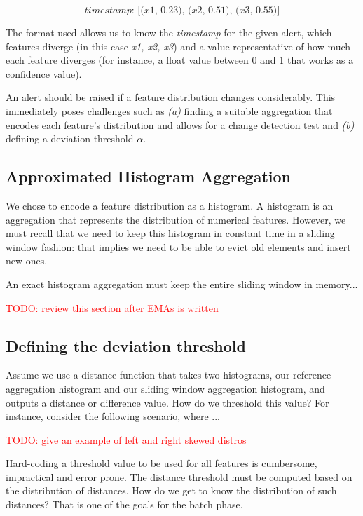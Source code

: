\[\textit{timestamp: [(x1, 0.23), (x2, 0.51), (x3, 0.55)}]\]

The format used allows us to know the \textit{timestamp} for the given alert, which features diverge (in this case \textit{x1, x2, x3}) and a value representative of how much each feature diverges (for instance, a float value between 0 and 1 that works as a confidence value). 

An alert should be raised if a feature distribution changes considerably. This immediately poses challenges such as \textit{(a)} finding a suitable aggregation that encodes each feature's distribution and allows for a change detection test and \textit{(b)} defining a deviation threshold $\alpha$.

\subsection*{Approximated Histogram Aggregation}

We chose to encode a feature distribution as a histogram. A histogram is an aggregation that represents the distribution of numerical features. However, we must recall that we need to keep this histogram in constant time in a sliding window fashion: that implies we need to be able to evict old elements and insert new ones.

An exact histogram aggregation must keep the entire sliding window in memory...

\textcolor{red}{TODO: review this section after EMAs is written}

\subsection*{Defining the deviation threshold}

Assume we use a distance function that takes two histograms, our reference aggregation histogram and our sliding window aggregation histogram, and outputs a distance or difference value. How do we threshold this value? For instance, consider the following scenario, where ...

\textcolor{red}{TODO: give an example of left and right skewed distros}

Hard-coding a threshold value to be used for all features is cumbersome, impractical and error prone. The distance threshold must be computed based on the distribution of distances. How do we get to know the distribution of such distances? That is one of the goals for the batch phase.

